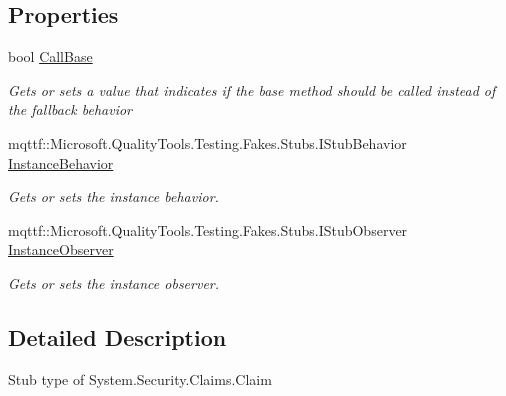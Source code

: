 \subsection*{Properties}
\begin{DoxyCompactItemize}
\item 
bool \hyperlink{class_system_1_1_security_1_1_claims_1_1_fakes_1_1_stub_claim_a11c17d22274e8919ede43bc156da9b13}{Call\-Base}
\begin{DoxyCompactList}\small\item\em Gets or sets a value that indicates if the base method should be called instead of the fallback behavior\end{DoxyCompactList}\item 
mqttf\-::\-Microsoft.\-Quality\-Tools.\-Testing.\-Fakes.\-Stubs.\-I\-Stub\-Behavior \hyperlink{class_system_1_1_security_1_1_claims_1_1_fakes_1_1_stub_claim_aedf0263792637d4eb0680549e7ce88d4}{Instance\-Behavior}
\begin{DoxyCompactList}\small\item\em Gets or sets the instance behavior.\end{DoxyCompactList}\item 
mqttf\-::\-Microsoft.\-Quality\-Tools.\-Testing.\-Fakes.\-Stubs.\-I\-Stub\-Observer \hyperlink{class_system_1_1_security_1_1_claims_1_1_fakes_1_1_stub_claim_a1599f8440ef8217aeca0bb76da9a360d}{Instance\-Observer}
\begin{DoxyCompactList}\small\item\em Gets or sets the instance observer.\end{DoxyCompactList}\end{DoxyCompactItemize}


\subsection{Detailed Description}
Stub type of System.\-Security.\-Claims.\-Claim



